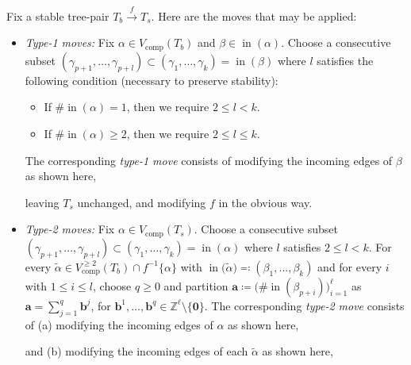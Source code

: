 \documentclass[11pt]{amsart}
\theoremstyle{definition}
\theoremstyle{remark}
\theoremstyle{plain}
\newcommand{\bZ}{\mathbb{Z}}
\newcommand\ba{\mathbf{a}}
\newcommand\bb{\mathbf{b}}
\newcommand\bzero{\mathbf{0}}
\newcommand{\on}{\operatorname}
\newcommand{\comp}{C^2}
\renewcommand{\comp}{{\on{comp}}}
\newcommand{\incom}{\on{in}}
\newcommand{\sr}{\stackrel}
\newcommand{\wt}{\widetilde}
\begin{document}
Fix a stable tree-pair $T_b \sr{f}{\to} T_s$.
Here are the moves that may be applied:

\begin{itemize}
\item[] {\emph{Type-1 moves:}} Fix $\alpha \in V_\comp(T_b)$ and $\beta \in \incom(\alpha)$.
Choose a consecutive subset $(\gamma_{p+1},\ldots,\gamma_{p+l}) \subset (\gamma_1,\ldots,\gamma_k) = \incom(\beta)$ where $l$ satisfies the following condition (necessary to preserve stability):
	\begin{itemize}
	\item If $\#\!\incom(\alpha) = 1$, then we require $2 \leq l < k$.

	\item If $\#\!\incom(\alpha) \geq 2$, then we require $2 \leq l \leq k$.
	\end{itemize}
The corresponding \emph{type-1 move} consists of modifying the incoming edges of $\beta$ as shown here,

\begin{figure}[H]
\centering
\def\svgwidth{0.4\columnwidth}

\label{fig:2T_move_1}
\end{figure}

\noindent leaving $T_s$ unchanged, and modifying $f$ in the obvious way.

\medskip

\item[] {\emph{Type-2 moves:}} Fix $\alpha \in V_\comp(T_s)$.
Choose a consecutive subset $(\gamma_{p+1},\ldots,\gamma_{p+l})\subset(\gamma_1,\ldots,\gamma_k)=\incom(\alpha)$ where $l$ satisfies $2 \leq l < k$.
For every $\wt\alpha \in V_\comp^{\geq 2}(T_b) \cap f^{-1}\{\alpha\}$ with $\incom\bigl(\wt\alpha\bigr) \eqqcolon (\beta_1,\ldots,\beta_k)$ and for every $i$ with $1 \leq i \leq l$, choose $q \geq 0$ and partition $\ba \coloneqq \bigl(\#\!\incom(\beta_{p+i})\bigr)_{i=1}^\ell$ as $\ba = \sum_{j=1}^q \bb^j$, for $\bb^1,\ldots,\bb^q \in \bZ^\ell\setminus\{\bzero\}$.
The corresponding \emph{type-2 move} consists of (a) \label{type2a} modifying the incoming edges of $\alpha$ as shown here,

\begin{figure}[H]
\centering
\def\svgwidth{0.35\columnwidth}

\label{fig:2T_move_2s}
\end{figure}

\noindent and (b) modifying the incoming edges of each $\wt \alpha$ as shown here,

\begin{figure}[H]
\centering
\def\svgwidth{0.7\columnwidth}

\label{fig:2T_move_2b}
\end{figure}


\end{itemize}
\end{document}
